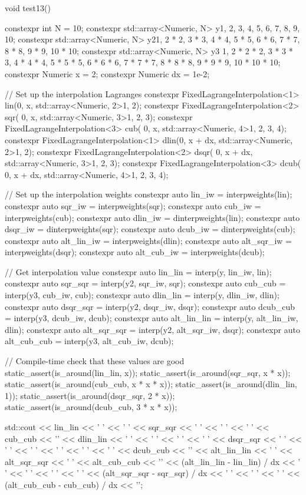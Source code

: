 \begin{code}
void test13() {
  constexpr int N = 10;
  constexpr std::array<Numeric, N> y{1, 2, 3, 4, 5, 6, 7, 8, 9, 10};
  constexpr std::array<Numeric, N> y2{1,     2 * 2, 3 * 3, 4 * 4, 5 * 5,
                                      6 * 6, 7 * 7, 8 * 8, 9 * 9, 10 * 10};
  constexpr std::array<Numeric, N> y3{
      1,         2 * 2 * 2, 3 * 3 * 3, 4 * 4 * 4, 5 * 5 * 5,
      6 * 6 * 6, 7 * 7 * 7, 8 * 8 * 8, 9 * 9 * 9, 10 * 10 * 10};
  constexpr Numeric x = 2;
  constexpr Numeric dx = 1e-2;

  // Set up the interpolation Lagranges
  constexpr FixedLagrangeInterpolation<1> lin(0, x,
                                                std::array<Numeric, 2>{1, 2});
  constexpr FixedLagrangeInterpolation<2> sqr(
      0, x, std::array<Numeric, 3>{1, 2, 3});
  constexpr FixedLagrangeInterpolation<3> cub(
      0, x, std::array<Numeric, 4>{1, 2, 3, 4});
  constexpr FixedLagrangeInterpolation<1> dlin(0, x + dx,
                                                 std::array<Numeric, 2>{1, 2});
  constexpr FixedLagrangeInterpolation<2> dsqr(
      0, x + dx, std::array<Numeric, 3>{1, 2, 3});
  constexpr FixedLagrangeInterpolation<3> dcub(
      0, x + dx, std::array<Numeric, 4>{1, 2, 3, 4});

  // Set up the interpolation weights
  constexpr auto lin_iw = interpweights(lin);
  constexpr auto sqr_iw = interpweights(sqr);
  constexpr auto cub_iw = interpweights(cub);
  constexpr auto dlin_iw = dinterpweights(lin);
  constexpr auto dsqr_iw = dinterpweights(sqr);
  constexpr auto dcub_iw = dinterpweights(cub);
  constexpr auto alt_lin_iw = interpweights(dlin);
  constexpr auto alt_sqr_iw = interpweights(dsqr);
  constexpr auto alt_cub_iw = interpweights(dcub);

  // Get interpolation value
  constexpr auto lin_lin = interp(y, lin_iw, lin);
  constexpr auto sqr_sqr = interp(y2, sqr_iw, sqr);
  constexpr auto cub_cub = interp(y3, cub_iw, cub);
  constexpr auto dlin_lin = interp(y, dlin_iw, dlin);
  constexpr auto dsqr_sqr = interp(y2, dsqr_iw, dsqr);
  constexpr auto dcub_cub = interp(y3, dcub_iw, dcub);
  constexpr auto alt_lin_lin = interp(y, alt_lin_iw, dlin);
  constexpr auto alt_sqr_sqr = interp(y2, alt_sqr_iw, dsqr);
  constexpr auto alt_cub_cub = interp(y3, alt_cub_iw, dcub);

  // Compile-time check that these values are good
  static_assert(is_around(lin_lin, x));
  static_assert(is_around(sqr_sqr, x * x));
  static_assert(is_around(cub_cub, x * x * x));
  static_assert(is_around(dlin_lin, 1));
  static_assert(is_around(dsqr_sqr, 2 * x));
  static_assert(is_around(dcub_cub, 3 * x * x));

  std::cout << lin_lin << ' ' << ' ' << sqr_sqr << ' ' << ' ' << ' ' << cub_cub
            << '\n'
            << dlin_lin << ' ' << ' ' << ' ' << ' ' << dsqr_sqr << ' ' << ' '
            << ' ' << ' ' << ' ' << ' ' << dcub_cub << '\n'
            << alt_lin_lin << ' ' << alt_sqr_sqr << ' ' << alt_cub_cub << '\n'
            << (alt_lin_lin - lin_lin) / dx << ' ' << ' ' << ' ' << ' '
            << (alt_sqr_sqr - sqr_sqr) / dx << ' ' << ' ' << ' '
            << (alt_cub_cub - cub_cub) / dx << '\n';
}
\end{code}


